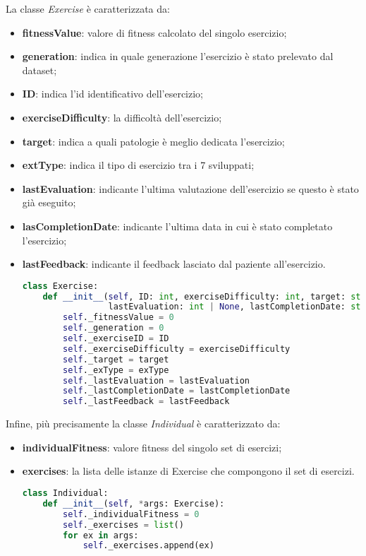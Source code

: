 \documentclass{article}
\begin{document}
\bigskip
\label{sec:exerciseImplementation}
La classe \textit{Exercise} è caratterizzata da:
\begin{itemize}
\item\textbf{fitnessValue}: valore di fitness calcolato del singolo esercizio;
\item\textbf{generation}: indica in quale generazione l'esercizio è stato prelevato dal dataset;
\item\textbf{ID}: indica l'id identificativo dell'esercizio;
\item\textbf{exerciseDifficulty}: la difficoltà dell'esercizio;
\item\textbf{target}: indica a quali patologie è meglio dedicata l'esercizio;
\item\textbf{extType}: indica il tipo di esercizio tra i 7 sviluppati;
\item\textbf{lastEvaluation}: indicante l'ultima valutazione dell'esercizio se questo è stato già eseguito;
\item\textbf{lasCompletionDate}: indicante l'ultima data in cui è stato completato l'esercizio;
\item\textbf{lastFeedback}: indicante il feedback lasciato dal paziente all'esercizio.

\begin{lstlisting}[language=Python]
    class Exercise:
    def __init__(self, ID: int, exerciseDifficulty: int, target: str, exType: str,
                 lastEvaluation: int | None, lastCompletionDate: str | None, lastFeedback: int | None):
        self._fitnessValue = 0
        self._generation = 0
        self._exerciseID = ID
        self._exerciseDifficulty = exerciseDifficulty
        self._target = target
        self._exType = exType
        self._lastEvaluation = lastEvaluation
        self._lastCompletionDate = lastCompletionDate
        self._lastFeedback = lastFeedback

\end{lstlisting}
\end{itemize}
\label{sec:individualImplementation}
Infine, più precisamente la classe \textit{Individual} è caratterizzato da:
\begin{itemize}
\item\textbf{individualFitness}: valore fitness del singolo set di esercizi;
\item\textbf{exercises}: la lista delle istanze di Exercise che compongono il set di esercizi.
\begin{lstlisting}[language = Python]
    class Individual:
    def __init__(self, *args: Exercise):
        self._individualFitness = 0
        self._exercises = list()
        for ex in args:
            self._exercises.append(ex)
\end{lstlisting}
\end{itemize}
\end{document}
